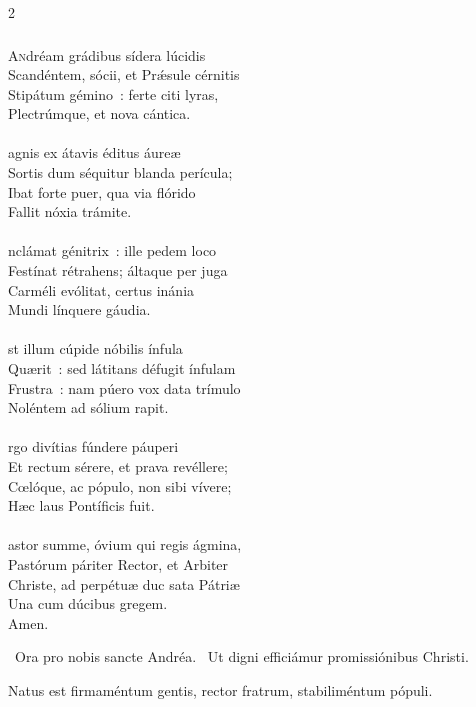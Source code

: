 \documentclass[9pt,twoside]{extarticle}
\begin{document}
\begin{multicols}{2}
{{{\subsubsection*{\center {}}
\lettrine{A}ndréam grádibus sídera lúcidis\\
Scandéntem, sócii, et Prǽsule cérnitis\\
Stipátum gémino~: ferte citi lyras,\\
Plectrúmque, et nova cántica.\\
\\
agnis ex átavis éditus áureæ\\
Sortis dum séquitur blanda perícula;\\
Ibat forte puer, qua via flórido\\
Fallit nóxia trámite.\\
\\
nclámat génitrix~: ille pedem loco\\
Festínat rétrahens; áltaque per juga\\
Carméli evólitat, certus inánia\\
Mundi línquere gáudia.\\
\\
st illum cúpide nóbilis ínfula\\
Quærit~: sed látitans défugit ínfulam\\
Frustra~: nam púero vox data trímulo\\
Noléntem ad sólium rapit.\\
\\
rgo divítias fúndere páuperi\\
Et rectum sérere, et prava revéllere;\\
Cœlóque, ac pópulo, non sibi vívere;\\
Hæc laus Pontíficis fuit.\\
\\
astor summe, óvium qui regis ágmina,\\
Pastórum páriter Rector, et Arbiter\\
Christe, ad perpétuæ duc sata Pátriæ\\
Una cum dúcibus gregem.\\
Amen.

\begin{tightlist}{}
\item {}~Ora pro nobis sancte Andréa. ~Ut digni efficiámur promissiónibus Christi.
\item {} Natus est firmaméntum gentis, rector fratrum, stabiliméntum pópuli.
\end{tightlist}

}}}
\end{multicols}
\end{document}
